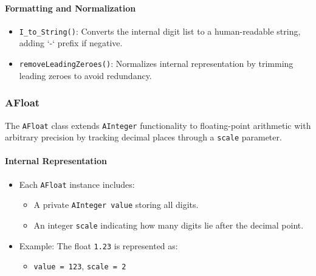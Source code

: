 \documentclass[12pt]{article}
\begin{document}
\paragraph*{\textbf{Formatting and Normalization}}
\begin{itemize}
  \item \texttt{I\_to\_String()}: Converts the internal digit list to a human-readable string, adding `-` prefix if negative.
  \item \texttt{removeLeadingZeroes()}: Normalizes internal representation by trimming leading zeroes to avoid redundancy.
\end{itemize}

\vspace{1em}
\subsubsection*{\textbf{\large AFloat}}

The \texttt{AFloat} class extends \texttt{AInteger} functionality to floating-point arithmetic with arbitrary precision by tracking decimal places through a \texttt{scale} parameter.

\paragraph*{\textbf{Internal Representation}}
\begin{itemize}
  \item Each \texttt{AFloat} instance includes:
  \begin{itemize}
    \item A private \texttt{AInteger value} storing all digits.
    \item An integer \texttt{scale} indicating how many digits lie after the decimal point.
  \end{itemize}
  \item Example: The float \texttt{1.23} is represented as:
  \begin{itemize}
    \item \texttt{value = 123}, \texttt{scale = 2}
  \end{itemize}
\end{itemize}
\end{document}
